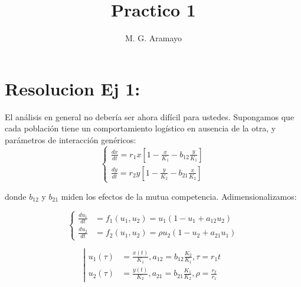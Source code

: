 \documentclass[twocolumn,aps,prl]{revtex4-1}
\begin{document}

\title{Practico 1}
\author{M. G. Aramayo}


\maketitle



\section{Resolucion Ej 1:}

El análisis en general no debería ser ahora difícil para ustedes. Supongamos que cada población tiene un comportamiento logístico en ausencia de la otra, y parámetros de interacción genéricos:
$$
\left\{
\begin{aligned}
    \frac{d x}{d t}=r_{1} x\left[1-\frac{x}{K_{1}}-b_{12} \frac{y}{K_{1}}\right] \\
    \frac{d y}{d t}=r_{2} y\left[1-\frac{y}{K_{2}}-b_{21} \frac{x}{K_{2}}\right]
\end{aligned}
\right.
$$

donde $b_{12}$ y $b_{21}$ miden los efectos de la mutua competencia. Adimensionalizamos:

$$
\left\{
\begin{aligned}
    \frac{d u_{1}}{d t} &= f_{1}\left(u_{1}, u_{2}\right) = u_{1}\left(1-u_{1}+a_{12} u_{2}\right) \\
    \frac{d u_{2}}{d t} &= f_{2}\left(u_{1}, u_{2}\right) = \rho u_{2}\left(1-u_{2}+a_{21} u_{1}\right)
\end{aligned}
\right.
$$

$$
\left\lvert 
\begin{aligned}
u_1(\tau) &= \frac{x(t)}{K_{1}}, a_{12} = b_{12} \frac{K_{2}}{K_{1}}, \tau=r_{1} t \\
u_2(\tau) &= \frac{y(t)}{K_{2}}, a_{21} = b_{21} \frac{K_{1}}{K_{2}}, \rho=\frac{r_{2}}{r_{1}}
\end{aligned}
\right.
$$
\end{document}
